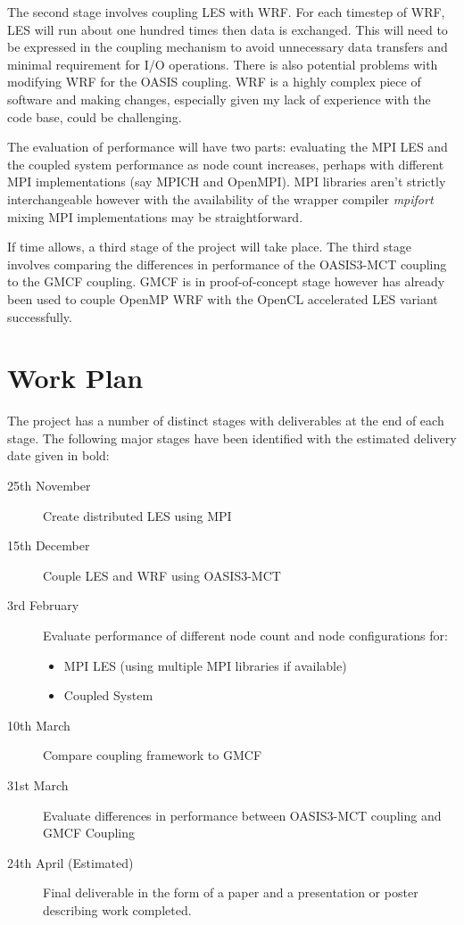 \documentclass{acm_proc_article-sp}
\renewcommand{\_}{\underscore\hspace{0pt}}
\begin{document}
The second stage involves coupling LES with WRF. For each timestep of WRF, LES
will run about one hundred times then data is exchanged. This will need to be
expressed in the coupling mechanism to avoid unnecessary data transfers and
minimal requirement for I/O operations. There is also potential problems with
modifying WRF for the OASIS coupling. WRF is a highly complex piece of software
and making changes, especially given my lack of experience with the code base,
could be challenging.

The evaluation of performance will have two parts: evaluating the MPI LES and
the coupled system performance as node count increases, perhaps with different
MPI implementations (say MPICH and OpenMPI). MPI libraries aren't strictly
interchangeable however with the availability of the wrapper compiler
\textit{mpifort} mixing MPI implementations may be straightforward.

If time allows, a third stage of the project will take place. The third stage
involves comparing the differences in performance of the OASIS3-MCT coupling to
the GMCF coupling. GMCF is in proof-of-concept stage however has already been
used to couple OpenMP WRF with the OpenCL accelerated LES variant successfully.

\section*{Work Plan}

The project has a number of distinct stages with deliverables at the end of each
stage. The following major stages have been identified with the estimated
delivery date given in bold:

\begin{description}
	\item[25th November] Create distributed LES using MPI
	\item[15th December] Couple LES and WRF using OASIS3-MCT
	\item[3rd February] Evaluate performance of different node count and node
    configurations for:
    \begin{itemize}
        \item MPI LES (using multiple MPI libraries if available)
        \item Coupled System
    \end{itemize}
	\item[10th March] Compare coupling framework to GMCF
	\item[31st March] Evaluate differences in performance between OASIS3-MCT
    coupling and GMCF Coupling
    \item[24th April (Estimated)] Final deliverable in the form of a paper and a
    presentation or poster describing work completed.
\end{description}



\end{document}
